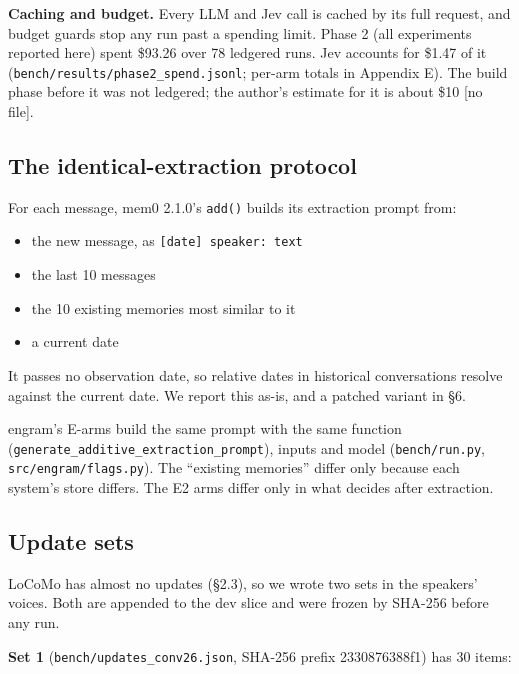 \documentclass[11pt]{article}
\newcommand{\src}[1]{}
\begin{document}
\textbf{Caching and budget.} Every LLM and Jev call is cached by its full request, and budget guards stop any run past a spending limit. Phase 2 (all experiments reported here) spent \$93.26\src{bench/results/phase2_spend.jsonl} over 78\src{bench/results/phase2_spend.jsonl} ledgered runs. Jev accounts for \$1.47\src{bench/results/phase2_spend.jsonl} of it (\texttt{bench/results/phase2\_\allowbreak{}spend.jsonl}; per-arm totals in Appendix E). The build phase before it was not ledgered; the author's estimate for it is about \$10 [no file].

\subsection{The identical-extraction protocol}
For each message, mem0 2.1.0's \texttt{add()} builds its extraction prompt from:

\begin{itemize}
\item the new message, as \texttt{[date] speaker: text}
\item the last 10\src{src/engram/flags.py (extract_last_k, as mem0 2.1.0)} messages
\item the 10\src{src/engram/config.py} existing memories most similar to it
\item a current date
\end{itemize}
It passes no observation date, so relative dates in historical conversations resolve against the current date. We report this as-is, and a patched variant in \S{}6.

engram's E-arms build the same prompt with the same function (\texttt{generate\_\allowbreak{}additive\_\allowbreak{}extraction\_\allowbreak{}prompt}), inputs and model (\texttt{bench/run.py}, \texttt{src/engram/flags.py}). The ``existing memories'' differ only because each system's store differs. The E2 arms differ only in what decides after extraction.

\subsection{Update sets}
LoCoMo has almost no updates (\S{}2.3), so we wrote two sets in the speakers' voices. Both are appended to the dev slice and were frozen by SHA-256 before any run.

\textbf{Set 1} (\texttt{bench/updates\_\allowbreak{}conv26.json}, SHA-256 prefix 2330876388f1\src{bench/updates_conv26.json}) has 30\src{bench/updates_conv26.json} items:
\end{document}
